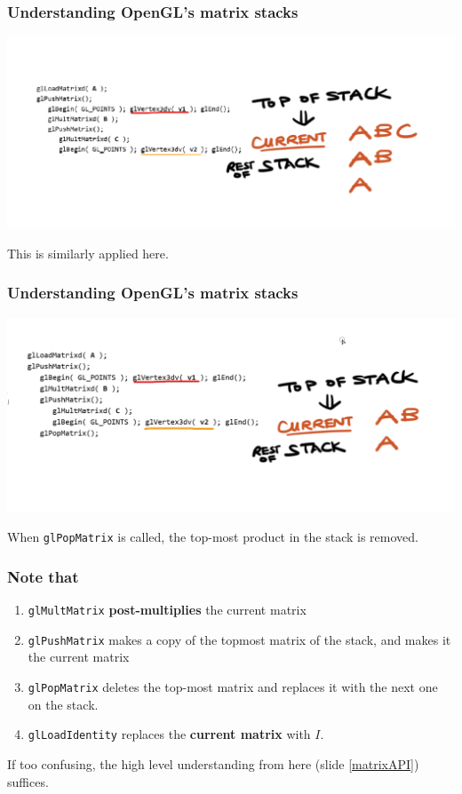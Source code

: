 \documentclass{beamer}
\begin{document}
\begin{frame}
    \frametitle{Understanding OpenGL's matrix stacks}

    \begin{center}
        \includegraphics[scale=0.4]{q8-4.png}
    \end{center}

    This is similarly applied here.

\end{frame}

\begin{frame}
    \frametitle{Understanding OpenGL's matrix stacks}

    \begin{center}
        \includegraphics[scale=0.4]{q8-5.png}
    \end{center}

    When \texttt{glPopMatrix} is called, the top-most product in the stack
    is removed.

\end{frame}

\begin{frame}
    \frametitle{Note that}

    \begin{enumerate}
        \item \texttt{glMultMatrix} \textbf{post-multiplies} the current matrix
        \item \texttt{glPushMatrix} makes a copy of the topmost matrix of the stack, and makes it the current matrix
        \item \texttt{glPopMatrix} deletes the top-most matrix and replaces it with the next one on the stack.
        \item \texttt{glLoadIdentity} replaces the \textbf{current matrix} with $I$.
    \end{enumerate}

    If too confusing, the high level understanding from here (slide \ref{matrixAPI}) suffices.

\end{frame}
\end{document}
